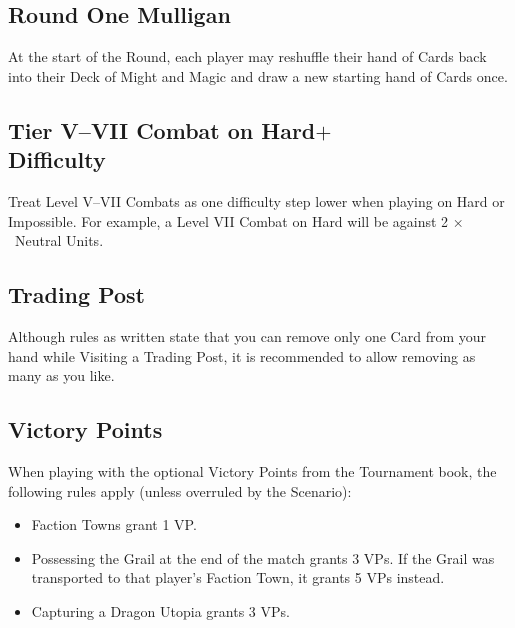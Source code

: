 \begin{multicols*}{2}
\subsection*{Round One Mulligan}

At the start of the  Round, each player may reshuffle their hand of Cards back into their Deck of Might and Magic and draw a new starting hand of Cards once.

\subsection*{Tier V--VII Combat on Hard$+$\\Difficulty}

Treat Level V--VII Combats as one difficulty step lower when playing on Hard or Impossible.
For example, a Level VII Combat on Hard will be against 2 × \azure\ Neutral Units.

{
  \hfill
  \vspace{-3em}
}

\subsection*{Trading Post}

Although rules as written state that you can remove only one Card from your hand while Visiting a Trading Post, it is recommended to allow removing as many as you like.

\subsection*{Victory Points}

When playing with the optional Victory Points from the Tournament book, the following rules apply (unless overruled by the Scenario):
\begin{itemize}
  \item Faction Towns grant 1 VP.
  \item Possessing the Grail at the end of the match grants 3 VPs. If the Grail was transported to that player's Faction Town, it grants 5 VPs instead.
  \item Capturing a Dragon Utopia grants 3 VPs.
\end{itemize}

\end{multicols*}

